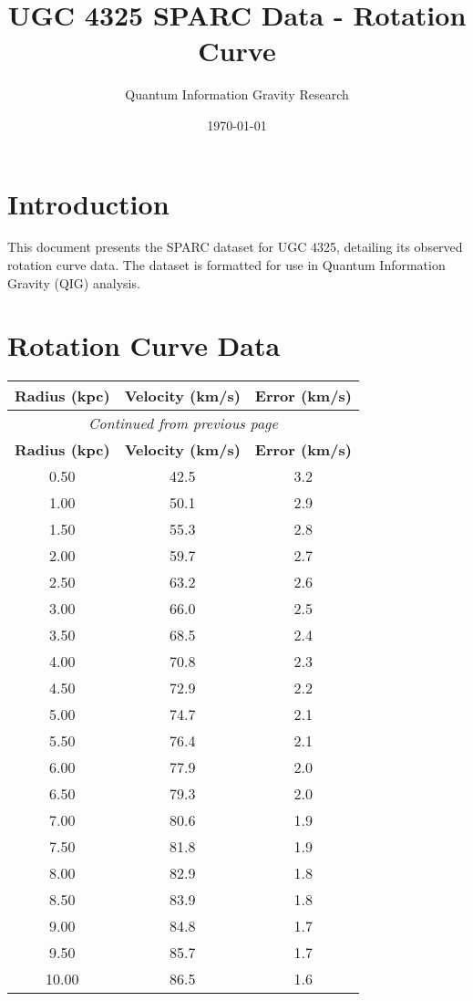 \documentclass{article}
\begin{document}
\title{UGC 4325 SPARC Data - Rotation Curve}
\author{Quantum Information Gravity Research}
\date{\today}
\maketitle

\section{Introduction}
This document presents the SPARC dataset for UGC 4325, detailing its observed rotation curve data. The dataset is formatted for use in Quantum Information Gravity (QIG) analysis.

\section{Rotation Curve Data}
\begin{longtable}{ccc}
\toprule
\textbf{Radius (kpc)} & \textbf{Velocity (km/s)} & \textbf{Error (km/s)} \\
\midrule
\endfirsthead

\multicolumn{3}{c}{\textit{Continued from previous page}} \\
\toprule
\textbf{Radius (kpc)} & \textbf{Velocity (km/s)} & \textbf{Error (km/s)} \\
\midrule
\endhead

\bottomrule
\endfoot

0.50 & 42.5 & 3.2 \\
1.00 & 50.1 & 2.9 \\
1.50 & 55.3 & 2.8 \\
2.00 & 59.7 & 2.7 \\
2.50 & 63.2 & 2.6 \\
3.00 & 66.0 & 2.5 \\
3.50 & 68.5 & 2.4 \\
4.00 & 70.8 & 2.3 \\
4.50 & 72.9 & 2.2 \\
5.00 & 74.7 & 2.1 \\
5.50 & 76.4 & 2.1 \\
6.00 & 77.9 & 2.0 \\
6.50 & 79.3 & 2.0 \\
7.00 & 80.6 & 1.9 \\
7.50 & 81.8 & 1.9 \\
8.00 & 82.9 & 1.8 \\
8.50 & 83.9 & 1.8 \\
9.00 & 84.8 & 1.7 \\
9.50 & 85.7 & 1.7 \\
10.00 & 86.5 & 1.6 \\
\end{longtable}
\end{document}

